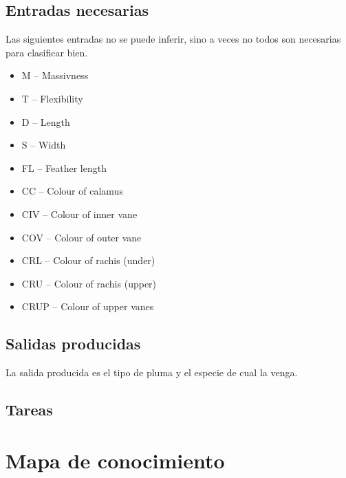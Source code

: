 \documentclass[a4paper,12pt]{article}
\begin{document}
\subsection{Entradas necesarias}
Las siguientes entradas no se puede inferir, sino a veces no todos son necesarias para clasificar bien.
\begin{itemize}
	\item M -- Massivness
	\item T -- Flexibility
	\item D -- Length
	\item S -- Width
	\item FL -- Feather length
	\item CC -- Colour of calamus
	\item CIV -- Colour of inner vane
	\item COV -- Colour of outer vane
	\item CRL -- Colour of rachis (under)
	\item CRU -- Colour of rachis (upper)
	\item CRUP -- Colour of upper vanes
\end{itemize}

\subsection{Salidas producidas}
La salida producida es el tipo de pluma y el especie de cual la venga.

\subsection{Tareas}

\section{Mapa de conocimiento}
\end{document}
